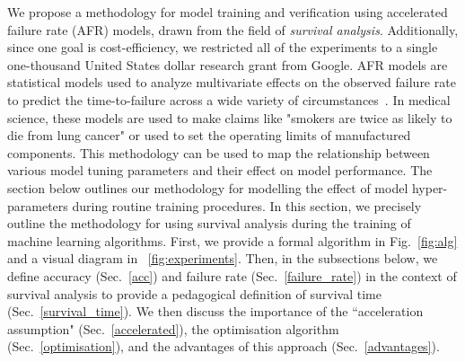 \documentclass[conference]{IEEEtran}
\begin{document}
We propose a methodology for model training and verification using accelerated failure rate (AFR) models, drawn from the field of \textit{survival analysis}. Additionally, since one goal is cost-efficiency, we restricted all of the experiments to a single one-thousand United States dollar research grant from Google.
AFR models are statistical models used to analyze multivariate effects on the observed failure rate to predict the time-to-failure across a wide variety of circumstances~\cite{aft_models,kleinbaum1996survival}. In medical science, these models are used to make claims like "smokers are twice as likely to die from lung cancer" or used to set the operating limits of manufactured components. This methodology can be used to map the relationship between various model tuning parameters and their effect on model performance.
The section below outlines our methodology for modelling the effect of model hyper-parameters during routine training procedures. In this section, we precisely outline the methodology for using survival analysis during the training of machine learning algorithms. First, we provide a formal algorithm in Fig.~\ref{fig:alg} and a visual diagram in ~\ref{fig:experiments}. Then, in  the subsections below, we define accuracy (Sec.~\ref{acc}) and failure rate (Sec.~\ref{failure_rate})  in the context of survival analysis to provide a pedagogical definition of survival time (Sec.~\ref{survival_time}). We then discuss the importance of the ``acceleration assumption" (Sec.~\ref{accelerated}), the optimisation algorithm (Sec.~\ref{optimisation}), and the advantages of this approach (Sec.~\ref{advantages}).
\end{document}
